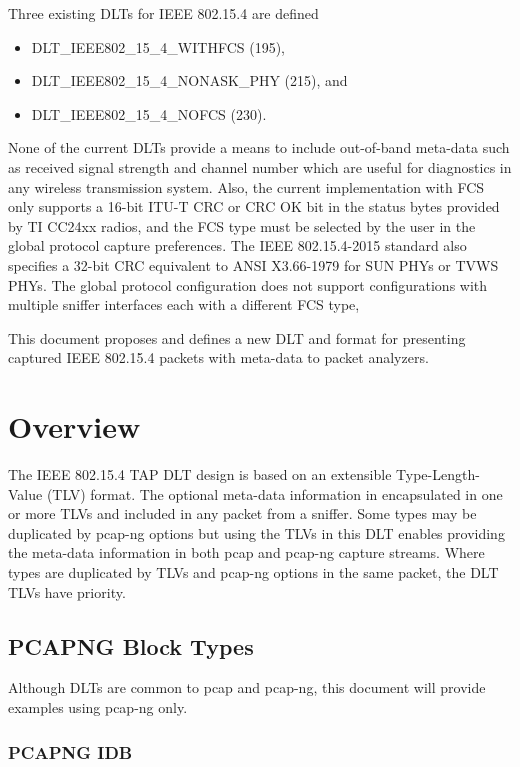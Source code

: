 \documentclass[12pt]{article}
\renewcommand\_{\textunderscore\allowbreak}
\begin{document}
Three existing DLTs for IEEE 802.15.4 are defined

\begin{itemize}
    \item DLT_IEEE802_15_4_WITHFCS (195),
    \item DLT_IEEE802_15_4_NONASK_PHY (215), and
    \item DLT_IEEE802_15_4_NOFCS (230).
\end{itemize}

None of the current DLTs provide a means to include out-of-band
meta-data such as received signal strength and channel number which are useful
for diagnostics in any wireless transmission system.  Also, the current
implementation with FCS only supports a 16-bit ITU-T CRC or CRC OK bit in the
status bytes provided by TI CC24xx radios, and the FCS type must be selected
by the user in the global protocol capture preferences.  The IEEE
802.15.4-2015 standard also specifies a 32-bit CRC equivalent to ANSI
X3.66-1979 for SUN PHYs or TVWS PHYs.  The global protocol configuration does
not support configurations with multiple sniffer interfaces each with a
different FCS type, 

This document proposes and defines a new DLT and format for presenting captured
IEEE 802.15.4 packets with meta-data to packet analyzers.

\newpage
\section{Overview}\label{sec:ovrvw}
The IEEE 802.15.4 TAP DLT design is based on an extensible Type-Length-Value
(TLV) format.  The optional meta-data information in encapsulated in one or
more TLVs and included in any packet from a sniffer.  Some types may be
duplicated by pcap-ng options but using the TLVs in this DLT enables providing
the meta-data information in both pcap and pcap-ng capture streams.  Where
types are duplicated by TLVs and pcap-ng options in the same packet,
the DLT TLVs have priority.

\subsection{PCAPNG Block Types}
Although DLTs are common to pcap and pcap-ng, this document will provide
examples using pcap-ng only.

\subsubsection{PCAPNG IDB}
\end{document}
